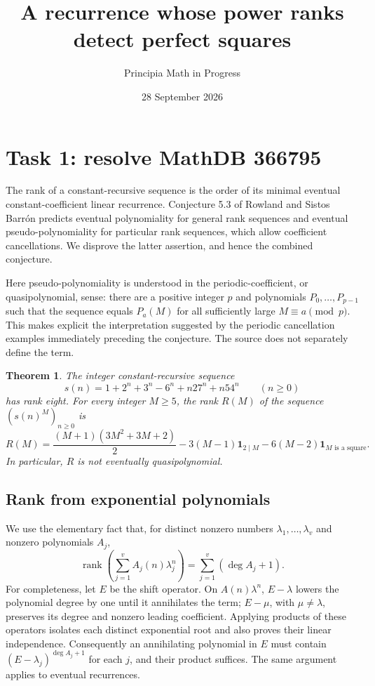 \documentclass[11pt]{article}
\title{A recurrence whose power ranks detect perfect squares}
\author{Principia Math in Progress}
\date{28 September 2026}
\newtheorem{theorem}{Theorem}
\newcommand{\ind}{\mathbf{1}}
\begin{document}
\maketitle

\section*{Task 1: resolve MathDB 366795}
The rank of a constant-recursive sequence is the order of its minimal
eventual constant-coefficient linear recurrence. Conjecture 5.3 of
Rowland and Sistos Barr\'on \cite{RS} predicts eventual polynomiality
for general rank sequences and eventual pseudo-polynomiality for
particular rank sequences, which allow coefficient cancellations.
We disprove the latter assertion, and hence the combined conjecture.

Here pseudo-polynomiality is understood in the periodic-coefficient,
or quasipolynomial, sense: there are a positive integer $p$ and
polynomials $P_0,\ldots,P_{p-1}$ such that the sequence equals
$P_a(M)$ for all sufficiently large $M\equiv a\pmod p$.
This makes explicit the interpretation suggested by the periodic
cancellation examples immediately preceding the conjecture.
The source does not separately define the term.

\begin{theorem}\label{thm}
The integer constant-recursive sequence
\begin{equation}\label{s}
s(n)=1+2^n+3^n-6^n+n27^n+n54^n\qquad(n\ge0)
\end{equation}
has rank eight. For every integer $M\ge5$, the rank $R(M)$ of
the sequence $(s(n)^M)_{n\ge0}$ is
\begin{equation}\label{rank}
R(M)=\frac{(M+1)(3M^2+3M+2)}2
-3(M-1)\ind_{2\mid M}-6(M-2)\ind_{M\text{ is a square}}.
\end{equation}
In particular, $R$ is not eventually quasipolynomial.
\end{theorem}

\subsection*{Rank from exponential polynomials}
We use the elementary fact that, for distinct nonzero numbers
$\lambda_1,\ldots,\lambda_v$ and nonzero polynomials $A_j$,
\begin{equation}\label{rankfact}
\operatorname{rank}\left(\sum_{j=1}^v A_j(n)\lambda_j^n\right)
=\sum_{j=1}^v(\deg A_j+1).
\end{equation}
For completeness, let $E$ be the shift operator. On $A(n)\lambda^n$,
$E-\lambda$ lowers the polynomial degree by one until it annihilates
the term; $E-\mu$, with $\mu\ne\lambda$, preserves its degree and
nonzero leading coefficient. Applying products of these operators
isolates each distinct exponential root and also proves their linear
independence. Consequently an annihilating polynomial in $E$ must
contain $(E-\lambda_j)^{\deg A_j+1}$ for each $j$, and their product
suffices. The same argument applies to eventual recurrences.
\end{document}

